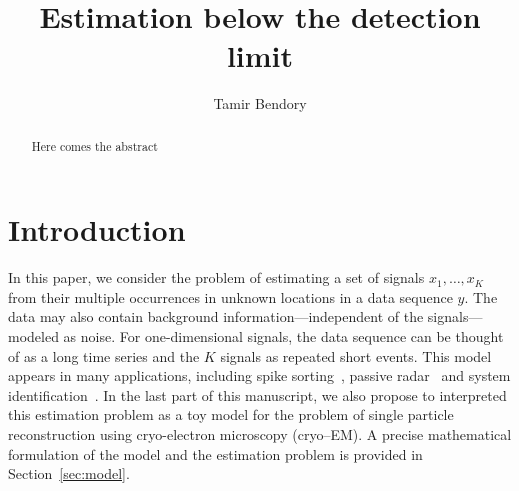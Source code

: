 \documentclass[english,11pt]{article}
\newcommand{\TODO}[1]{{\color{red}{[#1]}}}
\numberwithin{equation}{section}
\theoremstyle{plain}
\theoremstyle{definition}
\theoremstyle{remark}
\theoremstyle{plain}
\theoremstyle{remark}
\theoremstyle{plain}
\theoremstyle{plain}
\begin{document}
\title{Estimation below the detection limit}


\author{Tamir Bendory}
\maketitle

\begin{abstract}
	Here comes the abstract
\end{abstract}

\section{Introduction}

In this paper, we consider the problem of estimating a set of signals $x_1,\ldots,x_K$ from their multiple occurrences in unknown  locations in a data sequence $y$\TODO{This is the most important sentence of the paper, we need to polish it up}. The data may also contain background information---independent of the signals---modeled as noise.
For one-dimensional signals, the data sequence can be thought of as a 
long time series and the $K$ signals as repeated short events.  
This model appears in many applications, including spike sorting~\cite{lewicki1998review}, passive radar~\cite{gogineni2017passive} and system identification~\cite{ljung1998system}.
In the last part of this manuscript, we also propose to interpreted this estimation problem as a toy model for the problem of single particle reconstruction using cryo-electron microscopy (cryo--EM). A precise mathematical formulation of the model and the estimation problem is provided in Section~\ref{sec:model}.
\end{document}
